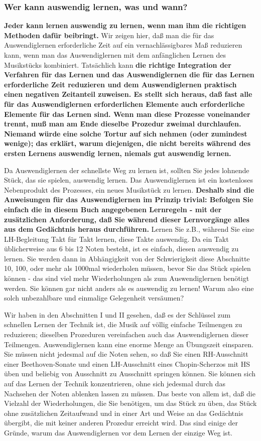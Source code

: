 \subsubsection{Wer kann auswendig lernen, was und wann?}
\label{c1iii6b}

\textbf{Jeder kann lernen auswendig zu lernen, wenn man ihm die richtigen Methoden dafür beibringt.}
Wir zeigen hier, daß man die für das Auswendiglernen erforderliche Zeit auf ein vernachlässigbares Maß reduzieren kann, wenn man das Auswendiglernen mit dem anfänglichen Lernen des Musikstücks kombiniert.
Tatsächlich kann \textbf{die richtige Integration der Verfahren für das Lernen und das Auswendiglernen die für das Lernen erforderliche Zeit reduzieren und dem Auswendiglernen praktisch einen negativen Zeitanteil zuweisen.
Es stellt sich heraus, daß fast alle für das Auswendiglernen erforderlichen Elemente auch erforderliche Elemente für das Lernen sind.
Wenn man diese Prozesse voneinander trennt, muß man am Ende dieselbe Prozedur zweimal durchlaufen.
Niemand würde eine solche Tortur auf sich nehmen (oder zumindest wenige); das erklärt, warum diejenigen, die nicht bereits während des ersten Lernens auswendig lernen, niemals gut auswendig lernen.}

Da Auswendiglernen der schnellste Weg zu lernen ist, sollten Sie jedes lohnende Stück, das sie spielen, auswendig lernen.
Das Auswendiglernen ist ein kostenloses Nebenprodukt des Prozesses, ein neues Musikstück zu lernen.
\textbf{Deshalb sind die Anweisungen für das Auswendiglernen im Prinzip trivial: Befolgen Sie einfach die in diesem Buch angegebenen Lernregeln - mit der zusätzlichen Anforderung, daß Sie während dieser Lernvorgänge alles aus dem Gedächtnis heraus durchführen.}
Lernen Sie z.B., während Sie eine LH-Begleitung Takt für Takt lernen, diese Takte auswendig.
Da ein Takt üblicherweise aus 6 bis 12 Noten besteht, ist es einfach, diesen auswendig zu lernen.
Sie werden dann in Abhängigkeit von der Schwierigkeit diese Abschnitte 10, 100, oder mehr als 1000mal wiederholen müssen, bevor Sie das Stück spielen können - das sind viel mehr Wiederholungen als zum Auswendiglernen benötigt werden.
Sie können gar nicht anders als es auswendig zu lernen!
Warum also eine solch unbezahlbare und einmalige Gelegenheit versäumen?

Wir haben in den Abschnitten I und II gesehen, daß es der Schlüssel zum schnellen Lernen der Technik ist, die Musik auf völlig einfache Teilmengen zu reduzieren; dieselben Prozeduren vereinfachen auch das Auswendiglernen dieser Teilmengen.
Auswendiglernen kann eine enorme Menge an Übungszeit einsparen.
Sie müssen nicht jedesmal auf die Noten sehen, so daß Sie einen RH-Ausschnitt einer Beethoven-Sonate und einen LH-Ausschnitt eines Chopin-Scherzos mit HS üben und beliebig von Ausschnitt zu Ausschnitt springen können.
Sie können sich auf das Lernen der Technik konzentrieren, ohne sich jedesmal durch das Nachsehen der Noten ablenken lassen zu müssen.
Das beste von allem ist, daß die Vielzahl der Wiederholungen, die Sie benötigen, um das Stück zu üben, das Stück ohne zusätzlichen Zeitaufwand und in einer Art und Weise an das Gedächtnis übergibt, die mit keiner anderen Prozedur erreicht wird.
Das sind einige der Gründe, warum das Auswendiglernen vor dem Lernen der einzige Weg ist.

